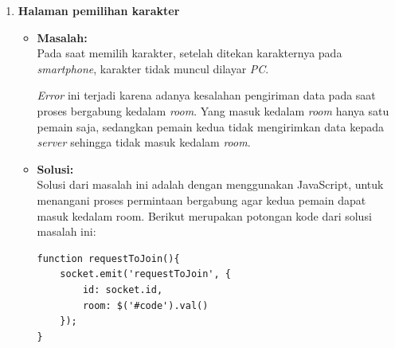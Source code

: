 \begin{enumerate}
	\item \textbf{Halaman pemilihan karakter}
	\begin{itemize}
		\item \textbf{Masalah:} \\
		Pada saat memilih karakter, setelah ditekan karakternya pada \textit{smartphone}, karakter tidak muncul dilayar \textit{PC}.
		
		\textit{Error} ini terjadi karena adanya kesalahan pengiriman data pada saat proses bergabung kedalam \textit{room}. Yang masuk kedalam \textit{room} hanya satu pemain saja, sedangkan pemain kedua tidak mengirimkan data kepada \textit{server} sehingga tidak masuk kedalam \textit{room}.
		
		\item \textbf{Solusi:} \\
		Solusi dari masalah ini adalah dengan menggunakan JavaScript, untuk menangani proses permintaan bergabung agar kedua pemain dapat masuk kedalam room. Berikut merupakan potongan kode dari solusi masalah ini:
		
\begin{lstlisting}[caption={Proses menangani memancarkan \textit{event}}, label={lst:submitEvent},captionpos=b, frame=single]
function requestToJoin(){
	socket.emit('requestToJoin', {
		id: socket.id,
		room: $('#code').val()
	});
}
\end{lstlisting}
	\end{itemize}
\end{enumerate}

